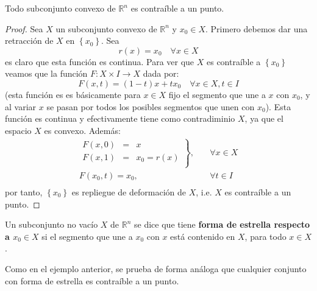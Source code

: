 \documentclass[12pt]{report}
\theoremstyle{largebreak}
\newcommand\cf[3]{\ensuremath{#1:#2\rightarrow#3}}
\begin{document}
    \begin{exa}
        Todo subconjunto convexo de $\mathbb{R}^n$ es contraíble a un punto.
    \end{exa}

    \begin{proof}
        Sea $X$ un subconjunto convexo de $\mathbb{R}^n$ y $x_0\in X$. Primero debemos dar una retracción de $X$ en $\left\{ x_0\right\}$. Sea
        \begin{equation*}
            r(x)=x_0\quad\forall x\in X
        \end{equation*}
        es claro que esta función es continua. Para ver que $X$ es contraíble a $\left\{x_0\right\}$ veamos que la función $\cf{F}{X\times I}{X}$ dada por:
        \begin{equation*}
            F(x,t)=(1-t)x+tx_0\quad\forall x\in X,t\in I
        \end{equation*}
        (esta función es es básicamente para $x\in X$ fijo el segmento que une a $x$ con $x_0$, y al variar $x$ se pasan por todos los posibles segmentos que unen con $x_0$). Esta función es continua y efectivamente tiene como contradiminio $X$, ya que el espacio $X$ es convexo. Además:
        \begin{equation*}
            \begin{split}
                \left.
                    \begin{array}{rcl}
                        F(x,0) & = & x \\
                        F(x,1) & = & x_0 = r(x) \\
                    \end{array}
                \right\},\quad&\forall x\in X\\
                F(x_0,t)=x_0,\quad&\forall t\in I\\
            \end{split}
        \end{equation*}
        por tanto, $\left\{x_0\right\}$ es repliegue de deformación de $X$, i.e. $X$ es contraíble a un punto.
    \end{proof}

    \begin{mydef}
        Un subconjunto no vacío $X$ de $\mathbb{R}^n$ se dice que tiene \textbf{forma de estrella respecto a $x_0\in X$} si el segmento que une a $x_0$ con $x$ está contenido en $X$, para todo $x\in X$.
    \end{mydef}    

    Como en el ejemplo anterior, se prueba de forma análoga que cualquier conjunto con forma de estrella es contraíble a un punto.
\end{document}
